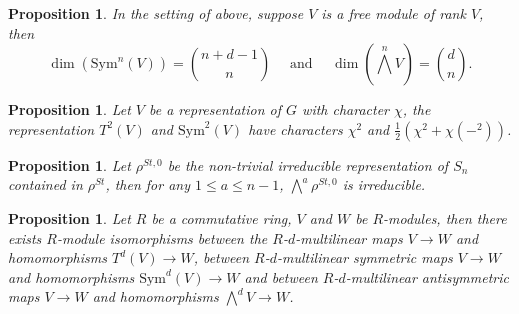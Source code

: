 \documentclass[paper=a4, fontsize=12pt]{scrartcl} %
\newtheorem{prop}[thm]{Proposition}
\theoremstyle{definition}
\theoremstyle{remark}
\begin{document}
\begin{prop}
	In the setting of above, suppose $V$ is a free module of rank $V$, then 
	$$\dim(\text{Sym}^n(V)) = \binom{n+d-1}{n} \quad \text{ and } \quad \dim(\bigwedge^n V) = \binom{d}{n}.$$
\end{prop}
\begin{prop}
	Let $V$ be a representation of $G$ with character $\chi$, the representation $T^2(V)$ and $\text{Sym}^2(V)$ have characters $\chi^2$ and $\frac{1}{2}(\chi^2+ \chi(-^2))$.
\end{prop}
\begin{prop}
	Let $\rho^{St,0}$ be the non-trivial irreducible representation of $S_n$ contained in $\rho^{St}$, then for any $1 \leq a \leq n-1$, $\bigwedge^a\rho^{St,0}$ is irreducible.
\end{prop}
\begin{prop}
	Let $R$ be a commutative ring, $V$ and $W$ be $R$-modules, then there exists $R$-module isomorphisms between the $R$-$d$-multilinear  maps $V\rightarrow W$ and homomorphisms $T^d(V) \rightarrow W$, between $R$-$d$-multilinear symmetric maps $V\rightarrow W$ and homomorphisms $\text{Sym}^d(V)\rightarrow W$ and between $R$-$d$-multilinear antisymmetric maps $V\rightarrow W$ and homomorphisms $\bigwedge^d V \rightarrow W$.
\end{prop}
\end{document}
